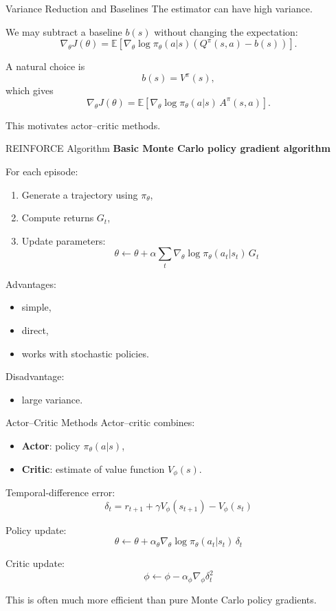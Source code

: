 \documentclass[aspectratio=169]{beamer}
\begin{document}
\begin{frame}{Variance Reduction and Baselines}
  The estimator can have high variance.

  We may subtract a baseline $b(s)$ without changing the expectation:
  \[
  \nabla_\theta J(\theta)=
  \mathbb{E}\left[
    \nabla_\theta \log \pi_\theta(a|s)\left(Q^\pi(s,a)-b(s)\right)
    \right].
  \]

  A natural choice is
  \[
  b(s)=V^\pi(s),
  \]
  which gives
  \[
  \nabla_\theta J(\theta)=
  \mathbb{E}\left[
    \nabla_\theta \log \pi_\theta(a|s)\,A^\pi(s,a)
    \right].
  \]

  This motivates actor--critic methods.
\end{frame}

\begin{frame}{REINFORCE Algorithm}
  \textbf{Basic Monte Carlo policy gradient algorithm}

  For each episode:
  \begin{enumerate}
  \item Generate a trajectory using $\pi_\theta$,
  \item Compute returns $G_t$,
  \item Update parameters:
    \[
    \theta \leftarrow \theta + \alpha
    \sum_t \nabla_\theta \log \pi_\theta(a_t|s_t)\,G_t
    \]
  \end{enumerate}

  Advantages:
  \begin{itemize}
  \item simple,
  \item direct,
  \item works with stochastic policies.
  \end{itemize}

  Disadvantage:
  \begin{itemize}
  \item large variance.
  \end{itemize}
\end{frame}

\begin{frame}{Actor--Critic Methods}
  Actor--critic combines:
  \begin{itemize}
  \item \textbf{Actor}: policy $\pi_\theta(a|s)$,
  \item \textbf{Critic}: estimate of value function $V_\phi(s)$.
  \end{itemize}

  Temporal-difference error:
  \[
  \delta_t=r_{t+1}+\gamma V_\phi(s_{t+1})-V_\phi(s_t)
  \]

  Policy update:
  \[
  \theta \leftarrow \theta + \alpha_\theta
  \nabla_\theta \log \pi_\theta(a_t|s_t)\,\delta_t
  \]

  Critic update:
  \[
  \phi \leftarrow \phi - \alpha_\phi \nabla_\phi \delta_t^2
  \]

  This is often much more efficient than pure Monte Carlo policy gradients.
\end{frame}
\end{document}
